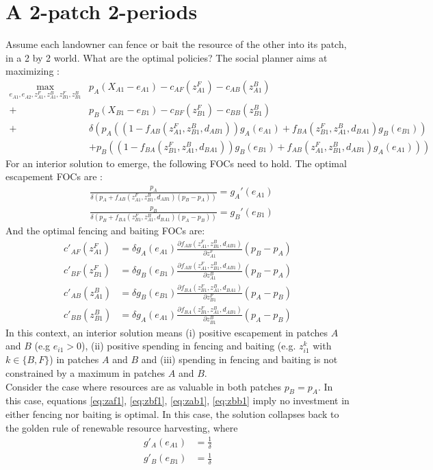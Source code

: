 \documentclass{article}
\begin{document}
\section{A 2-patch 2-periods}
Assume each landowner can fence or bait the resource of the other into its patch, in a 2 by 2 world. What are the optimal policies? The social planner aims at maximizing : 
\begin{align*}
\max_{e_{A1}, e_{A2}, z_{A1}^F, z_{A1}^B, z_{B1}^F, z_{B1}^B}&p_A(X_{A1}-e_{A1}) - c_{AF}(z_{A1}^F) - c_{AB}(z_{A1}^B) \\
+ &p_B(X_{B1}-e_{B1}) - c_{BF}(z_{B1}^F) - c_{BB}(z_{B1}^B) \\
+ & \delta \left(p_A((1-f_{AB}(z_{A1}^F, z_{B1}^B, d_{AB1}))g_A(e_{A1}) + f_{BA}(z_{B1}^F, z_{A1}^B, d_{BA1})g_B(e_{B1}))\right.\\
& + \left. p_B((1-f_{BA}(z_{B1}^F, z_{A1}^B, d_{BA1}))g_B(e_{B1}) + f_{AB}(z_{A1}^F, z_{B1}^B, d_{AB1})g_A(e_{A1})) \right)
\end{align*}
For an interior solution to emerge, the following FOCs need to hold. 
The optimal escapement FOCs are : 
\begin{align}
&\frac{p_A}{\delta \left(p_A + f_{AB}(z_{A1}^F, z_{B1}^B, d_{AB1})(p_B-p_A)\right)} = g_A'(e_{A1}) \label{eq:ea1}\\
%
&\frac{p_B}{\delta \left( p_B + f_{BA}(z_{B1}^F, z_{A1}^B, d_{BA1})(p_A-p_B)\right)} = g_B'(e_{B1}) \label{eq:ea2}
\end{align}
And the optimal fencing and baiting FOCs are:
\begin{align}
c'_{AF}(z_{A1}^F) &= \delta g_A(e_{A1}) \frac{\partial f_{AB}(z_{A1}^F, z_{B1}^B, d_{AB1})}{\partial z_{A1}^F}\left(p_B - p_A \right) \label{eq:zaf1}\\
%
c'_{BF}(z_{B1}^F) &= \delta g_B(e_{B1}) \frac{\partial f_{AB}(z_{A1}^F, z_{B1}^B, d_{AB1})}{\partial z_{A1}^B}(p_B - p_A) \label{eq:zbf1}\\
%
c'_{AB}(z_{A1}^B) &= \delta  g_B(e_{B1})\frac{\partial f_{BA}(z_{B1}^F, z_{A1}^B, d_{BA1})}{\partial z_{B1}^F}(p_A - p_B) \label{eq:zab1}\\
%
c'_{BB}(z_{B1}^B) & = \delta g_A(e_{A1}) \frac{\partial f_{BA}(z_{B1}^F, z_{A1}^B, d_{AB1})}{\partial z_{B1}^B}(p_{A} - p_{B})
\label{eq:zbb1}
\end{align}
In this context, an interior solution means (i) positive escapement in patches $A$ and $B$ (e.g $e_{i1}>0$), (ii) positive spending in fencing and baiting (e.g. $z_{i1}^k$ with $k \in \{B, F\}$) in patches $A$ and $B$ and (iii) spending in fencing and baiting is not constrained by a maximum in patches $A$ and $B$. 
\\
 Consider the case where resources are as valuable in both patches $p_B = p_A$. In this case, equations \ref{eq:zaf1}, \ref{eq:zbf1}, \ref{eq:zab1}, \ref{eq:zbb1} imply no investment in either fencing nor baiting is optimal. In this case, the solution collapses back to the golden rule of renewable resource harvesting, where 
\begin{align*}
g'_A(e_{A1}) &= \frac{1}{\delta}\\
g'_B(e_{B1}) &= \frac{1}{\delta}
\end{align*}
\end{document}
